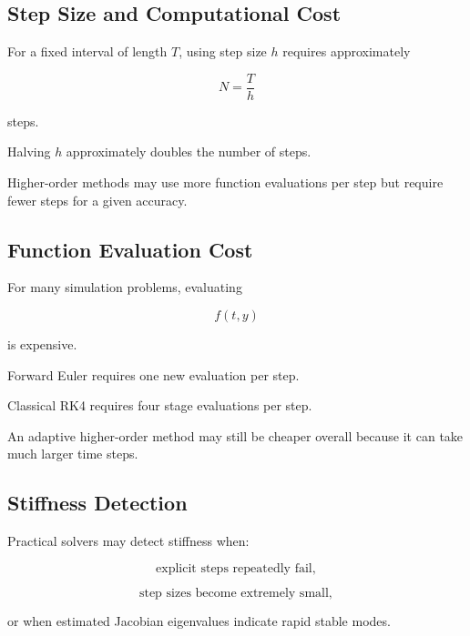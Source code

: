 \subsection{Step Size and Computational Cost}
\label{subsec:ode-step-size-cost}

For a fixed interval of length \(T\), using step size \(h\) requires
approximately

\[
\boxed{
N
=
\frac{T}{h}
}
\]

steps.

Halving \(h\) approximately doubles the number of steps.

Higher-order methods may use more function evaluations per step but require
fewer steps for a given accuracy.

\subsection{Function Evaluation Cost}
\label{subsec:ode-function-evaluation-cost}

For many simulation problems, evaluating

\[
f(t,y)
\]

is expensive.

Forward Euler requires one new evaluation per step.

Classical RK4 requires four stage evaluations per step.

An adaptive higher-order method may still be cheaper overall because it
can take much larger time steps.

\subsection{Stiffness Detection}
\label{subsec:ode-stiffness-detection}

Practical solvers may detect stiffness when:

\[
\boxed{
\text{explicit steps repeatedly fail},
}
\]

\[
\boxed{
\text{step sizes become extremely small},
}
\]

or when estimated Jacobian eigenvalues indicate rapid stable modes.

